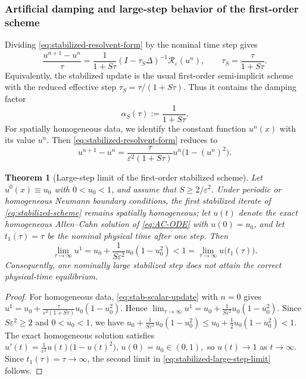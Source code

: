 \documentclass[final, 3p, times]{elsarticle}%
\newcommand{\eps}{\varepsilon}
\newcommand{\Reps}{\mathcal R_\varepsilon}
\newtheorem{theorem}{Theorem}[section]
\begin{document}
\subsubsection{Artificial damping and large-step behavior of the first-order scheme}

Dividing \eqref{eq:stabilized-resolvent-form} by the nominal time step gives
\begin{equation}
    \frac{u^{n+1}-u^n}{\tau}
    =
    \frac{1}{1+S\tau}(I-\tau_S\Delta)^{-1}\Reps(u^n),
    \qquad
    \tau_S=\frac{\tau}{1+S\tau}.
    \label{eq:stabilized-slope}
\end{equation}
Equivalently, the stabilized update is the usual first-order semi-implicit
scheme with the reduced effective step \(\tau_S=\tau/(1+S\tau)\). Thus it contains the damping factor
\begin{equation}
    \alpha_S(\tau):=\frac{1}{1+S\tau}.
    \label{eq:stabilized-alpha}
\end{equation}
For spatially homogeneous data, we identify the constant function \(u^n(x)\)
with its value \(u^n\). Then \eqref{eq:stabilized-resolvent-form} reduces to
\begin{equation}
    u^{n+1}-u^n
    =\frac{\tau}{\eps^2(1+S\tau)}u^n\bigl(1-(u^n)^2\bigr).
    \label{eq:stab-scalar-update}
\end{equation}
\begin{theorem}[Large-step limit of the first-order stabilized scheme]
\label{thm:stabilized-strong-delay}
Let \(u^0(x)\equiv u_0\) with \(0<u_0<1\), and assume that
\(S\ge 2/\eps^2\). Under periodic or homogeneous Neumann boundary
conditions, the first stabilized iterate of \eqref{eq:stabilized-scheme} remains spatially homogeneous;
let \(u(t)\) denote the exact
homogeneous Allen--Cahn solution of \eqref{eq:AC-ODE} with
\(u(0)=u_0\), and let \(t_1(\tau)=\tau\) be the nominal physical time
after one step. Then
\begin{equation}
    \lim_{\tau\to\infty}u^1
    =u_0+\frac{1}{S\eps^2}u_0(1-u_0^2)
    <1
    =\lim_{\tau\to\infty}u\bigl(t_1(\tau)\bigr).
    \label{eq:stabilized-large-step-limit}
\end{equation}
Consequently, one nominally large stabilized step does not attain the
correct physical-time equilibrium.
\end{theorem}

\begin{proof}
For homogeneous data, \eqref{eq:stab-scalar-update} with \(n=0\) gives
$
    u^1=u_0+\frac{\tau}{\eps^2(1+S\tau)}u_0(1-u_0^2).
$
Hence
$
    \lim_{\tau\to\infty}u^1=u_0+\frac{1}{S\eps^2}u_0(1-u_0^2).
$
Since \(S\eps^2\ge2\) and \(0<u_0<1\),
we have $u_0+\frac{1}{S\eps^2}u_0(1-u_0^2)\le u_0+\frac12u_0(1-u_0^2)<1.$
The exact homogeneous solution satisfies
$
    u'(t)=\frac{1}{\eps^2}u(t)\bigl(1-u(t)^2\bigr),
    \, u(0)=u_0\in(0,1),
$
so \(u(t)\to1\) as \(t\to\infty\). Since
\(t_1(\tau)=\tau\to\infty\), the second limit in
\eqref{eq:stabilized-large-step-limit} follows.
\end{proof}
\end{document}
